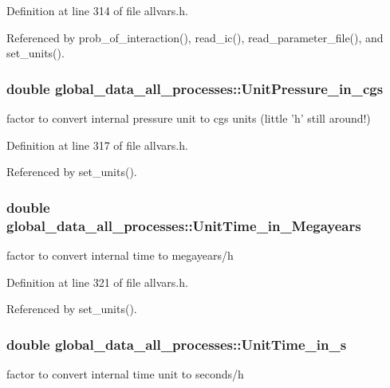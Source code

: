 Definition at line 314 of file allvars.h.



Referenced by prob\_\-of\_\-interaction(), read\_\-ic(), read\_\-parameter\_\-file(), and set\_\-units().

\hypertarget{structglobal__data__all__processes_a4938f30bc3da1d4583d42f806ad11201}{
\subsubsection[{UnitPressure\_\-in\_\-cgs}]{\setlength{\rightskip}{0pt plus 5cm}double {\bf global\_\-data\_\-all\_\-processes::UnitPressure\_\-in\_\-cgs}}}
\label{structglobal__data__all__processes_a4938f30bc3da1d4583d42f806ad11201}
factor to convert internal pressure unit to cgs units (little 'h' still around!) 

Definition at line 317 of file allvars.h.



Referenced by set\_\-units().

\hypertarget{structglobal__data__all__processes_a833ed48234b2780d7a668ae90c84318e}{
\subsubsection[{UnitTime\_\-in\_\-Megayears}]{\setlength{\rightskip}{0pt plus 5cm}double {\bf global\_\-data\_\-all\_\-processes::UnitTime\_\-in\_\-Megayears}}}
\label{structglobal__data__all__processes_a833ed48234b2780d7a668ae90c84318e}
factor to convert internal time to megayears/h 

Definition at line 321 of file allvars.h.



Referenced by set\_\-units().

\hypertarget{structglobal__data__all__processes_a4fa94d45bad042101623c3403f6b8c37}{
\subsubsection[{UnitTime\_\-in\_\-s}]{\setlength{\rightskip}{0pt plus 5cm}double {\bf global\_\-data\_\-all\_\-processes::UnitTime\_\-in\_\-s}}}
\label{structglobal__data__all__processes_a4fa94d45bad042101623c3403f6b8c37}
factor to convert internal time unit to seconds/h 

